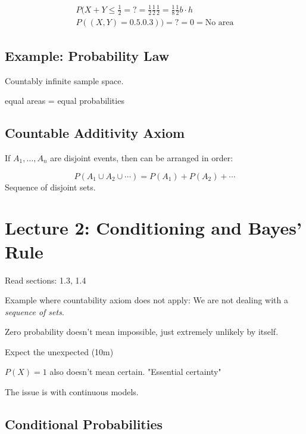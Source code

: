 \documentclass{article}
\begin{document}
\begin{align*}
P(X+Y \le \frac{1}{2}=? = \frac{1}{2} \frac{1}{2}\frac{1}{2} = \frac{1}{8}\frac{1}{2}b\cdot h\\
P((X,Y) = 0.5.0.3))= ? = 0 = \text{No area}
\end{align*}





\subsection{Example: Probability Law}

Countably infinite sample space.

equal areas = equal probabilities

\subsection{Countable Additivity Axiom}

If $A_1,\ldots, A_n$ are disjoint events, then can be arranged in order:

$$
P(A_1 \cup A_2 \cup \cdots) = P(A_1) + P(A_2) + \cdots
$$
Sequence of disjoint sets.


\section{Lecture 2: Conditioning and Bayes' Rule}

 Read sections: 1.3, 1.4\\

Example where countability axiom does not apply: We are not dealing with a \textit{sequence of sets}.

Zero probability doesn't mean impossible, just extremely unlikely by itself.

Expect the unexpected (10m)

$P(X)=1$ also doesn't mean certain.  "Essential certainty"

The issue is with continuous models.

\subsection{Conditional Probabilities}
\end{document}
